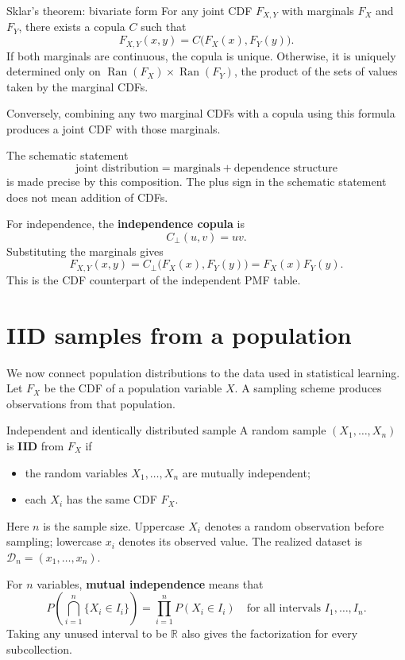 \documentclass[a4paper,12pt,oneside]{report}
\begin{document}
\begin{framedthm}{Sklar's theorem: bivariate form}
For any joint CDF $F_{X,Y}$ with marginals $F_X$ and $F_Y$,
there exists a copula $C$ such that
\[
  F_{X,Y}(x,y)=C\bigl(F_X(x),F_Y(y)\bigr).
\]
If both marginals are continuous, the copula is unique. Otherwise,
it is uniquely determined only on
$\operatorname{Ran}(F_X)\times\operatorname{Ran}(F_Y)$, the product
of the sets of values taken by the marginal CDFs.

Conversely, combining any two marginal CDFs with a copula using
this formula produces a joint CDF with those marginals.
\end{framedthm}

The schematic statement
\[
  \text{joint distribution}
  =\text{marginals}+\text{dependence structure}
\]
is made precise by this composition. The plus sign in the
schematic statement does not mean addition of CDFs.

For independence, the \textbf{independence copula} is
\[
  C_{\perp}(u,v)=uv.
\]
Substituting the marginals gives
\[
  F_{X,Y}(x,y)=C_{\perp}\bigl(F_X(x),F_Y(y)\bigr)
    =F_X(x)F_Y(y).
\]
This is the CDF counterpart of the independent PMF table.

\clearpage
\section{IID samples from a population}
\label{sec:iid-sample}

We now connect population distributions to the data used in
statistical learning. Let $F_X$ be the CDF of a population
variable $X$. A sampling scheme produces observations from that
population.

\begin{frameddefn}{Independent and identically distributed sample}
A random sample $(X_1,\ldots,X_n)$ is \textbf{IID} from $F_X$ if
\begin{itemize}
  \item the random variables $X_1,\ldots,X_n$ are mutually
    independent;
  \item each $X_i$ has the same CDF $F_X$.
\end{itemize}
Here $n$ is the sample size. Uppercase $X_i$ denotes a random
observation before sampling; lowercase $x_i$ denotes its observed
value. The realized dataset is $\mathcal D_n=(x_1,\ldots,x_n)$.
\end{frameddefn}

For $n$ variables, \textbf{mutual independence} means that
\[
  P\left(\bigcap_{i=1}^n\{X_i\in I_i\}\right)
    =\prod_{i=1}^nP(X_i\in I_i)
  \quad\text{for all intervals }I_1,\ldots,I_n.
\]
Taking any unused interval to be $\mathbb R$ also gives the
factorization for every subcollection.
\end{document}
